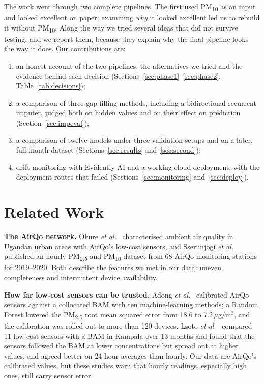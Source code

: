 \documentclass{ieeeaccess}
\newcommand{\ugm}{\,$\mu$g/m$^{3}$}
\newcommand{\pmtwo}{PM\textsubscript{2.5}}
\newcommand{\pmten}{PM\textsubscript{10}}
\begin{document}
The work went through two complete pipelines. The first used \pmten{} as an input and looked excellent on paper; examining \emph{why} it looked excellent led us to rebuild it without \pmten{}. Along the way we tried several ideas that did not survive testing, and we report them, because they explain why the final pipeline looks the way it does. Our contributions are:
\begin{enumerate}
\item an honest account of the two pipelines, the alternatives we tried and the evidence behind each decision (Sections~\ref{sec:phase1}--\ref{sec:phase2}, Table~\ref{tab:decisions});
\item a comparison of three gap-filling methods, including a bidirectional recurrent imputer, judged both on hidden values and on their effect on prediction (Section~\ref{sec:impeval});
\item a comparison of twelve models under three validation setups and on a later, full-month dataset (Sections~\ref{sec:results} and~\ref{sec:second});
\item drift monitoring with Evidently AI and a working cloud deployment, with the deployment routes that failed (Sections~\ref{sec:monitoring} and~\ref{sec:deploy}).
\end{enumerate}

\section{Related Work}
\label{sec:related}

\textbf{The AirQo network.} Okure \emph{et al.}~\cite{okure2022} characterised ambient air quality in Ugandan urban areas with AirQo's low-cost sensors, and Sserunjogi \emph{et al.}~\cite{sserunjogi2022} published an hourly \pmtwo{} and \pmten{} dataset from 68 AirQo monitoring stations for 2019--2020. Both describe the features we met in our data: uneven completeness and intermittent device availability.

\textbf{How far low-cost sensors can be trusted.} Adong \emph{et al.}~\cite{adong2022} calibrated AirQo sensors against a collocated BAM with ten machine-learning methods; a Random Forest lowered the \pmtwo{} root mean squared error from 18.6 to 7.2\ugm{}, and the calibration was rolled out to more than 120 devices. Lsoto \emph{et al.}~\cite{lsoto2026} compared 11 low-cost sensors with a BAM in Kampala over 13 months and found that the sensors followed the BAM at lower concentrations but spread out at higher values, and agreed better on 24-hour averages than hourly. Our data are AirQo's calibrated values, but these studies warn that hourly readings, especially high ones, still carry sensor error.
\end{document}

